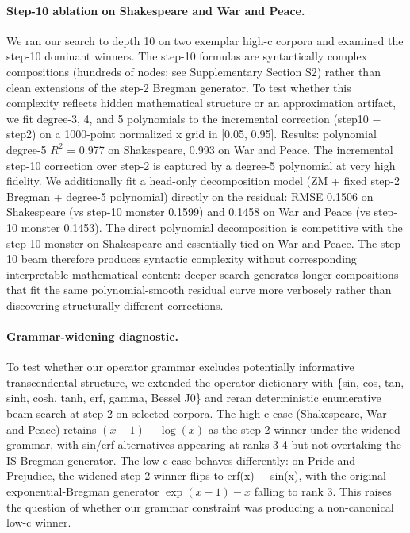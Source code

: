 \documentclass[11pt]{article}
\begin{document}
\paragraph{Step-10 ablation on Shakespeare and War and Peace.} We ran our search to depth 10 on two exemplar high-c corpora and examined the step-10 dominant winners. The step-10 formulas are syntactically complex compositions (hundreds of nodes; see Supplementary Section S2) rather than clean extensions of the step-2 Bregman generator. To test whether this complexity reflects hidden mathematical structure or an approximation artifact, we fit degree-3, 4, and 5 polynomials to the incremental correction (step10 − step2) on a 1000-point normalized x grid in [0.05, 0.95]. Results: polynomial degree-5 $R^2$ = 0.977 on Shakespeare, 0.993 on War and Peace. The incremental step-10 correction over step-2 is captured by a degree-5 polynomial at very high fidelity. We additionally fit a head-only decomposition model (ZM + fixed step-2 Bregman + degree-5 polynomial) directly on the residual: RMSE 0.1506 on Shakespeare (vs step-10 monster 0.1599) and 0.1458 on War and Peace (vs step-10 monster 0.1453). The direct polynomial decomposition is competitive with the step-10 monster on Shakespeare and essentially tied on War and Peace. The step-10 beam therefore produces syntactic complexity without corresponding interpretable mathematical content: deeper search generates longer compositions that fit the same polynomial-smooth residual curve more verbosely rather than discovering structurally different corrections.

\paragraph{Grammar-widening diagnostic.} To test whether our operator grammar excludes potentially informative transcendental structure, we extended the operator dictionary with \{sin, cos, tan, sinh, cosh, tanh, erf, gamma, Bessel J0\} and reran deterministic enumerative beam search at step 2 on selected corpora. The high-c case (Shakespeare, War and Peace) retains $(x-1)-\log(x)$ as the step-2 winner under the widened grammar, with sin/erf alternatives appearing at ranks 3-4 but not overtaking the IS-Bregman generator. The low-c case behaves differently: on Pride and Prejudice, the widened step-2 winner flips to erf(x) − sin(x), with the original exponential-Bregman generator $\exp(x-1)-x$ falling to rank 3. This raises the question of whether our grammar constraint was producing a non-canonical low-c winner.
\end{document}
